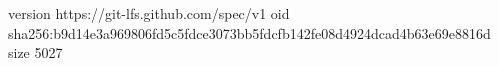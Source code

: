 version https://git-lfs.github.com/spec/v1
oid sha256:b9d14e3a969806fd5c5fdce3073bb5fdcfb142fe08d4924dcad4b63e69e8816d
size 5027
